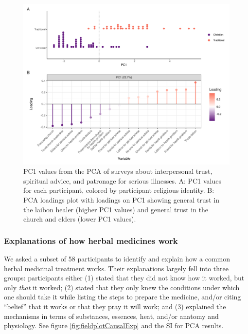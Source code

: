 \documentclass[
  11pt,
]{article}
\begin{document}
\begin{landscape}

\begin{figure}[p]

{\centering \includegraphics{magic-healers-article2_files/figure-latex/fieldplotlaibonPCA-1} 

}

\caption{PC1 values from the PCA of surveys about interpersonal trust, spiritual advice, and patronage for serious illnesses. A: PC1 values for each participant, colored by participant religious identity. B: PCA loadings plot with loadings on PC1 showing general trust in the laibon healer (higher PC1 values) and general trust in the church and elders (lower PC1 values).}\label{fig:fieldplotlaibonPCA}
\end{figure}

\end{landscape}

\hypertarget{explanations-of-how-herbal-medicines-work}{%
\subsubsection{Explanations of how herbal medicines work}\label{explanations-of-how-herbal-medicines-work}}

We asked a subset of 58 participants to identify and explain how a common herbal medicinal treatment works. Their explanations largely fell into three groups: participants either (1) stated that they did not know how it worked, but only \emph{that} it worked; (2) stated that they only knew the conditions under which one should take it while listing the steps to prepare the medicine, and/or citing ``belief'' that it works or that they pray it will work; and (3) explained the mechanisms in terms of substances, essences, heat, and/or anatomy and physiology. See figure \ref{fig:fieldplotCausalExp} and the SI for PCA results.
\end{document}
